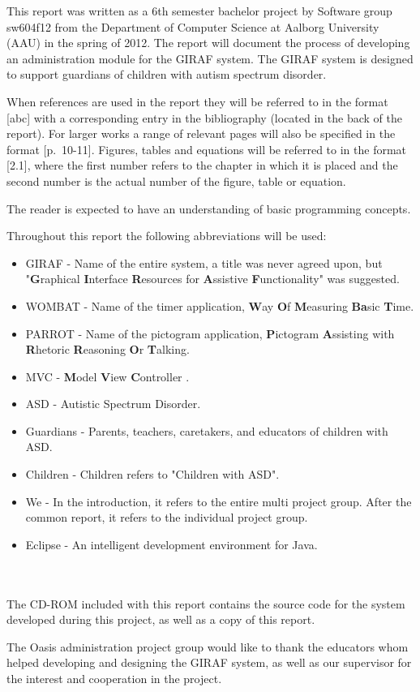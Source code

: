 This report was written as a 6th semester bachelor project by Software group sw604f12 from the Department of Computer Science at Aalborg University (AAU) in the spring of 2012. The report will document the process of developing an administration module for the GIRAF system. The GIRAF system is designed to support guardians of children with autism spectrum disorder.

When references are used in the report they will be referred to in the format [abc] with a corresponding entry in the bibliography (located in the back of the report). For larger works a range of relevant pages will also be specified in the format [p.~10-11]. Figures, tables and equations will be referred to in the format [2.1], where the first number refers to the chapter in which it is placed and the second number is the actual number of the figure, table or equation.

The reader is expected to have an understanding of basic programming concepts.

Throughout this report the following abbreviations will be used:

\begin{itemize}
	\item GIRAF - Name of the entire system, a title was never agreed upon, but "\textbf{G}raphical
	\textbf{I}nterface \textbf{R}esources for \textbf{A}ssistive \textbf{F}unctionality" was suggested.
	\item WOMBAT - Name of the timer application, \textbf{W}ay \textbf{O}f \textbf{M}easuring \textbf{Ba}sic \textbf{T}ime. 
	\item PARROT - Name of the pictogram application, \textbf{P}ictogram \textbf{A}ssisting with \textbf{R}hetoric \textbf{R}easoning \textbf{O}r \textbf{T}alking.
	\item MVC - \textbf{M}odel \textbf{V}iew \textbf{C}ontroller \cite{MVC}.
	\item ASD - Autistic Spectrum Disorder.
	\item Guardians - Parents, teachers, caretakers, and educators of children with ASD.
	\item Children - Children refers to "Children with ASD".
	\item We - In the introduction, it refers to the entire multi project group. After the common report, it refers to the individual project group.
	\item Eclipse - An intelligent development environment for Java.
	
\end{itemize}

\\ \\

The CD-ROM included with this report contains the source code for the system developed during this project, as well as a copy of this report.

The Oasis administration project group would like to thank the educators whom helped developing and designing the GIRAF system, as well as our supervisor for the interest and cooperation in the project.